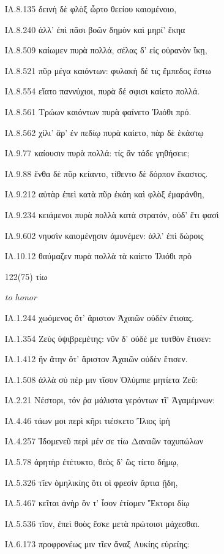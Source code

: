 \begin{enumerate}
{ΙΛ.8.135 δεινὴ δὲ φλὸξ ὦρτο θεείου καιομένοιο,

ΙΛ.8.240 ἀλλ' ἐπὶ πᾶσι βοῶν δημὸν καὶ μηρί' ἔκηα

ΙΛ.8.509 καίωμεν πυρὰ πολλά, σέλας δ' εἰς οὐρανὸν ἵκῃ,

ΙΛ.8.521 πῦρ μέγα καιόντων: φυλακὴ δέ τις ἔμπεδος ἔστω

ΙΛ.8.554 εἵατο παννύχιοι, πυρὰ δέ σφισι καίετο πολλά.

ΙΛ.8.561 Τρώων καιόντων πυρὰ φαίνετο Ἰλιόθι πρό.

ΙΛ.8.562 χίλι' ἄρ' ἐν πεδίῳ πυρὰ καίετο, πὰρ δὲ ἑκάστῳ

ΙΛ.9.77 καίουσιν πυρὰ πολλά: τίς ἂν τάδε γηθήσειε;

ΙΛ.9.88 ἔνθα δὲ πῦρ κείαντο, τίθεντο δὲ δόρπον ἕκαστος.

ΙΛ.9.212 αὐτὰρ ἐπεὶ κατὰ πῦρ ἐκάη καὶ φλὸξ ἐμαράνθη,

ΙΛ.9.234 κειάμενοι πυρὰ πολλὰ κατὰ στρατόν, οὐδ' ἔτι φασὶ

ΙΛ.9.602 νηυσὶν καιομένῃσιν ἀμυνέμεν: ἀλλ' ἐπὶ δώροις

ΙΛ.10.12 θαύμαζεν πυρὰ πολλὰ τὰ καίετο Ἰλιόθι πρὸ

}

\clearpage
\item[\large 122(75)]{\large \g τίω	}

\hspace{0.2cm} \textit{ to honor }

{\g
ΙΛ.1.244 χωόμενος ὅτ' ἄριστον Ἀχαιῶν οὐδὲν ἔτισας.

ΙΛ.1.354 Ζεὺς ὑψιβρεμέτης: νῦν δ' οὐδέ με τυτθὸν ἔτισεν:

ΙΛ.1.412 ἣν ἄτην ὅτ' ἄριστον Ἀχαιῶν οὐδὲν ἔτισεν.

ΙΛ.1.508 ἀλλὰ σύ πέρ μιν τῖσον Ὀλύμπιε μητίετα Ζεῦ:

ΙΛ.2.21 Νέστορι, τόν ῥα μάλιστα γερόντων τῖ' Ἀγαμέμνων:

ΙΛ.4.46 τάων μοι περὶ κῆρι τιέσκετο Ἴλιος ἱρὴ

ΙΛ.4.257 Ἰδομενεῦ περὶ μέν σε τίω Δαναῶν ταχυπώλων

ΙΛ.5.78 ἀρητὴρ ἐτέτυκτο, θεὸς δ' ὣς τίετο δήμῳ,

ΙΛ.5.326 τῖεν ὁμηλικίης ὅτι οἱ φρεσὶν ἄρτια ᾔδη,

ΙΛ.5.467 κεῖται ἀνὴρ ὅν τ' ἶσον ἐτίομεν Ἕκτορι δίῳ

ΙΛ.5.536 τῖον, ἐπεὶ θοὸς ἔσκε μετὰ πρώτοισι μάχεσθαι.

ΙΛ.6.173 προφρονέως μιν τῖεν ἄναξ Λυκίης εὐρείης:

}
\end{enumerate}
